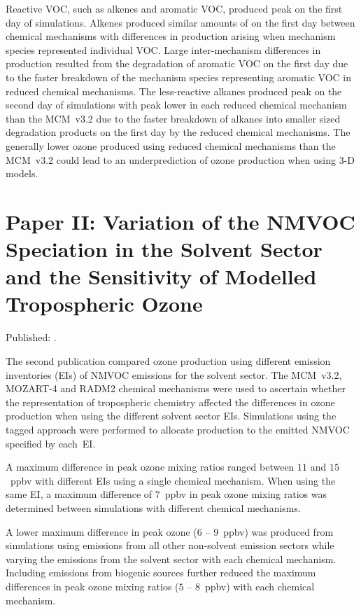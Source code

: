 Reactive VOC, such as alkenes and aromatic VOC, produced peak  on the first day of simulations.
Alkenes produced similar amounts of  on the first day between chemical mechanisms with differences in  production arising when mechanism species represented individual VOC.
Large inter-mechanism differences in  production resulted from the degradation of aromatic VOC on the first day due to the faster breakdown of the mechanism species representing aromatic VOC in reduced chemical mechanisms.
The less-reactive alkanes produced peak  on the second day of simulations with peak  lower in each reduced chemical mechanism than the MCM~v3.2 due to the faster breakdown of alkanes into smaller sized degradation products on the first day by the reduced chemical mechanisms.
The generally lower ozone produced using reduced chemical mechanisms than the MCM~v3.2 could lead to an underprediction of ozone production when using 3-D models.

\newpage
\singlespacing
\section{Paper II: Variation of the NMVOC Speciation in the Solvent Sector and the Sensitivity of Modelled Tropospheric Ozone} \label{s:EI_results}
\onehalfspacing

\vspace{-6mm}
\noindent
Published: .
\vspace{5mm}

The second publication compared ozone production using different emission inventories (EIs) of NMVOC emissions for the solvent sector.
The MCM~v3.2, MOZART-4 and RADM2 chemical mechanisms were used to ascertain whether the representation of tropospheric chemistry affected the differences in ozone production when using the different solvent sector EIs.
Simulations using the tagged approach were performed to allocate  production to the emitted NMVOC specified by each~EI.

A maximum difference in peak ozone mixing ratios ranged between $11$ and $15$~ppbv with different EIs using a single chemical mechanism.
When using the same EI, a maximum difference of $7$~ppbv in peak ozone mixing ratios was determined between simulations with different chemical mechanisms.

A lower maximum difference in peak ozone ($6$ -- $9$~ppbv) was produced from simulations using emissions from all other non-solvent emission sectors while varying the emissions from the solvent sector with each chemical mechanism.
Including emissions from biogenic sources further reduced the maximum differences in peak ozone mixing ratios ($5$ -- $8$~ppbv) with each chemical mechanism.

